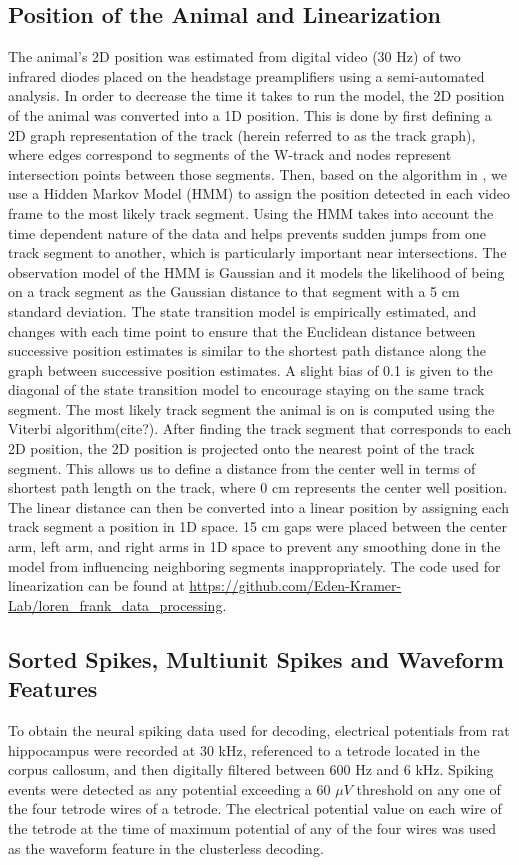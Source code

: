\documentclass[times, twoside]{zHenriquesLab-StyleBioRxiv}
\begin{document}
\subsection*{Position of the Animal and Linearization}
The animal's 2D position was estimated from digital video (30 Hz) of two infrared diodes placed on the headstage preamplifiers using a semi-automated analysis. In order to decrease the time it takes to run the model, the 2D position of the animal was converted into a 1D position. This is done by first defining a 2D graph representation of the track (herein referred to as the track graph), where edges correspond to segments of the W-track and nodes represent intersection points between those segments. Then, based on the algorithm in \cite{NewsonHiddenMarkovmap2009}, we use a Hidden Markov Model (HMM) to assign the position detected in each video frame to the most likely track segment. Using the HMM takes into account the time dependent nature of the data and helps prevents sudden jumps from one track segment to another, which is particularly important near intersections. The observation model of the HMM is Gaussian and it models the likelihood of being on a track segment as the Gaussian distance to that segment with a 5 cm standard deviation. The state transition model is empirically estimated, and changes with each time point to ensure that the Euclidean distance between successive position estimates is similar to the shortest path distance along the graph between successive position estimates. A slight bias of 0.1 is given to the diagonal of the state transition model to encourage staying on the same track segment. The most likely track segment the animal is on is computed using the Viterbi algorithm(cite?). After finding the track segment that corresponds to each 2D position, the 2D position is projected onto the nearest point of the track segment. This allows us to define a distance from the center well in terms of shortest path length on the track, where 0 cm represents the center well position. The linear distance can then be converted into a linear position by assigning each track segment a position in 1D space. 15 cm gaps were placed between the center arm, left arm, and right arms in 1D space to prevent any smoothing done in the model from influencing neighboring segments inappropriately. The code used for linearization can be found at \url{https://github.com/Eden-Kramer-Lab/loren_frank_data_processing}.

\subsection*{Sorted Spikes, Multiunit Spikes and Waveform Features}
To obtain the neural spiking data used for decoding, electrical potentials from rat hippocampus were recorded at 30 kHz, referenced to a tetrode located in the corpus callosum, and then digitally filtered between 600 Hz and 6 kHz. Spiking events were detected as any potential exceeding a 60 $\mu V$ threshold on any one of the four tetrode wires of a tetrode. The electrical potential value on each wire of the tetrode at the time of maximum potential of any of the four wires was used as the waveform feature in the clusterless decoding.
\end{document}
